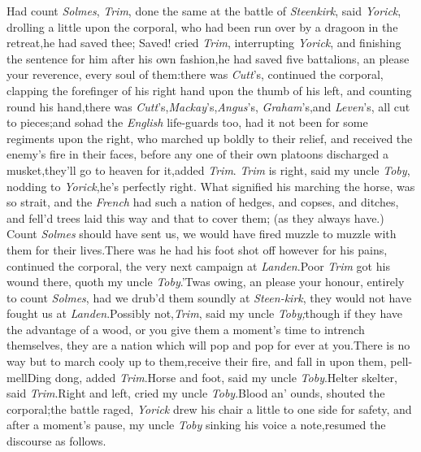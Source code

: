 \documentclass{article}
\begin{document}
Had count \textit{Solmes}, \textit{Trim}, done the\break
same at the battle of \textit{Steenkirk}, said \textit{Yo\-rick}, drolling a little upon the
corporal, who had been run over by a dragoon in the retreat,\tsh he had
saved thee;\tsh\break
Saved! cried \textit{Trim}, interrupting
\textit{Yorick}, and finishing the sentence for him after his own
fashion,\tsh he had saved five\break
battalions, an please your reverence,\break
every soul of them:\tsh there was \textit{Cutt}’s,\break
\tsk continued the corporal, clapping the 
forefinger of his right hand upon the\break
thumb of his left, and counting round his hand,\tsh there was
\textit{Cutt}’s,\tsh \textit{Mackay}’s,\tsh \textit{Angus}’s,\tsh
\textit{Graham}’s,\tsh and \textit{Leven}’s, all cut to pieces;\tsh and
so\break had the \textit{English} life-guards too, had it\break
not been for some regiments upon the right, who marched up boldly to their relief, and
received the enemy’s fire in their faces, before any one of their own
platoons discharged a musket,\tsh they’ll go to heaven for it,\tsk added
\textit{Trim}.\tsk{}
\textit{Trim} is right, said my uncle \textit{Toby}, nod\-ding to
\textit{Yorick},\tsh he’s perfectly right.\break
What signified his marching the horse, 
was so strait, and the \textit{French} had such a
nation of hedges, and copses, and ditches, 
and fell’d trees laid this way and that to
cover them; (as they always have.)\tsh
Count \textit{Solmes} should have sent us,\tsh 
we would have fired muzzle to muzzle
with them for their lives.\tsh There was
he had his foot shot off however for his
pains, continued the corporal, the very
next campaign at \textit{Landen}.\tsk Poor \textit{Trim}
got his wound there, quoth my uncle
\textit{Toby}.\tsh ’Twas owing, an please your
honour, entirely to count \textit{Solmes},\tsh\break
had we drub’d them soundly at \textit{Steen-\break kirk},
they would not have fought us at 
\textit{Landen}.\tsh Possibly not,\tsh \textit{Trim}, said 
my uncle \textit{Toby;}\tsh though if they have
the advantage of a wood, or you give
them a moment’s time to intrench themselves, they are a nation
which will pop and pop for ever at you.\tsh There is no way but
to march cooly up to them,\break\tsh receive their fire, and
fall in upon them, pell-mell\tsh Ding dong, added
\textit{Trim}.\tsh Horse and foot, said my uncle
\textit{Toby}.\tsh Helter skelter, said \textit{Trim}.\tsh Right
and left, cried my uncle \textit{Toby}.\tsh Blood an’ ounds,
shouted the corporal;\break\tsh the battle raged,\tsh
\textit{Yorick} drew his chair a little to one side for safety,
and after a moment’s pause, my uncle \textit{Toby} sinking his
voice a note,\tsk resumed the discourse as follows.
\end{document}
